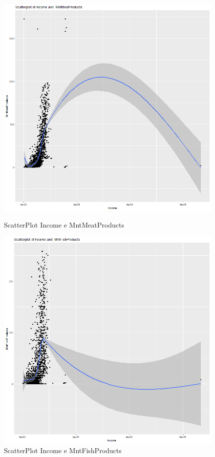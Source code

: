 \documentclass[letterpaper,11pt]{article}
\begin{document}
\begin{figure}[H]
  \centering
  \begin{minipage}[b]{0.4\textwidth}
    \includegraphics[width=\textwidth]{Img/EDA/EDA037.png}
    \caption{ScatterPlot Income e MntMeatProducts}
     \label{fig:ScatterPlotIncomeMntMeat}
  \end{minipage}
  \hfill
  \begin{minipage}[b]{0.4\textwidth}
    \includegraphics[width=\textwidth]{Img/EDA/EDA038.png}
    \caption{ScatterPlot Income e MntFishProducts}
     \label{fig:ScatterPlotIncomeMntFish}
  \end{minipage}
\end{figure}
\end{document}
